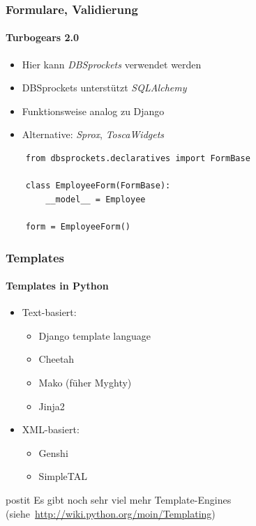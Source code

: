 \documentclass[
    t,
    smaller,
    compress,
    xcolor=svgnames,            %
    table,
]{beamer}
\newenvironment{beamerpostit}[1]%
{\begin{beamercolorbox}[wd=\textwidth,sep=2pt,rounded=true,shadow=true]{postit} #1}%
{\end{beamercolorbox}}%
\begin{document}
\begin{frame}[fragile]
  \frametitle{Formulare, Validierung}
  \framesubtitle{Turbogears 2.0}
  \begin{itemize}[<1->]
     \item Hier kann \textit{DBSprockets} verwendet werden
     \item DBSprockets unterstützt \textit{SQLAlchemy}
     \item Funktionsweise analog zu Django
     \item Alternative: \textit{Sprox}, \textit{ToscaWidgets}
  \end{itemize}
  \begin{lstlisting}
    from dbsprockets.declaratives import FormBase

    class EmployeeForm(FormBase):
        __model__ = Employee

    form = EmployeeForm()
  \end{lstlisting}
\end{frame}


\begin{frame}
  \frametitle{Templates}
  \framesubtitle{Templates in Python}
  \begin{itemize}[<1->]
    \item Text-basiert:
        \begin{itemize}[<1->]
            \item Django template language
            \item Cheetah
            \item Mako (füher Myghty)
            \item Jinja2
        \end{itemize}
    \item XML-basiert:
        \begin{itemize}[<1->]
            \item Genshi
            \item SimpleTAL
        \end{itemize}
  \end{itemize}

  \vspace{12pt}
  \begin{beamerpostit}
    Es gibt noch sehr viel mehr Template-Engines
    (siehe~\url{http://wiki.python.org/moin/Templating})
  \end{beamerpostit}

\end{frame}
\end{document}
